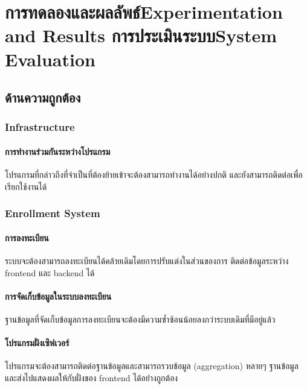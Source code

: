 \chapter{\ifproject%
\ifcpe การทดลองและผลลัพธ์\else Experimentation and Results\fi
\else%
\ifcpe การประเมินระบบ\else System Evaluation\fi
\fi}

\section{ด้านความถูกต้อง}

\subsection{Infrastructure}

\subsubsection{การทำงานร่วมกันระหว่างโปรแกรม}

โปรแกรมที่กล่าวถึงที่จำเป็นที่ต้องย้ายเข้าจะต้องสามารถทำงานได้อย่างปกติ และยังสามารถติดต่อเพื่อเรียกใช้งานได้

\subsection{Enrollment System}

\subsubsection{การลงทะเบียน}

ระบบจะต้องสามารถลงทะเบียนได้คล้ายเดิมโดยการปรับแต่งในส่วนของการ ติดต่อข้อมูลระหว่าง frontend และ backend ได้

\subsubsection{การจัดเก็บข้อมูลในระบบลงทะเบียน}

ฐานข้อมูลที่จัดเก็บข้อมูลการลงทะเบียนจะต้องมีความซ้ำซ้อนน้อยลงกว่าระบบเดิมที่มีอยู่แล้ว

\subsubsection{โปรแกรมฝั่งเซิฟเวอร์}

โปรแกรมจะต้องสามารถติดต่อฐานข้อมูลและสามารถรวบข้อมูล (aggregation) หลายๆ ฐานข้อมูลและส่งไปแสดงผลให้กับฝั่งของ frontend ได้อย่่างถูกต้อง

